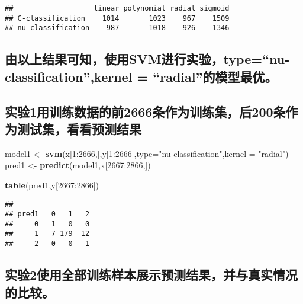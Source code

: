 \documentclass[]{article}
\newenvironment{Shaded}{\begin{snugshade}}{\end{snugshade}}
\newcommand{\KeywordTok}[1]{\textcolor[rgb]{0.13,0.29,0.53}{\textbf{{#1}}}}
\newcommand{\DataTypeTok}[1]{\textcolor[rgb]{0.13,0.29,0.53}{{#1}}}
\newcommand{\DecValTok}[1]{\textcolor[rgb]{0.00,0.00,0.81}{{#1}}}
\newcommand{\StringTok}[1]{\textcolor[rgb]{0.31,0.60,0.02}{{#1}}}
\newcommand{\NormalTok}[1]{{#1}}
\begin{document}
\begin{verbatim}
##                   linear polynomial radial sigmoid
## C-classification    1014       1023    967    1509
## nu-classification    987       1018    926    1346
\end{verbatim}

\subsection{\texorpdfstring{由以上结果可知，使用SVM进行实验，type=``nu-classification'',kernel
=
``radial''的模型最优。}{由以上结果可知，使用SVM进行实验，type=nu-classification,kernel = radial的模型最优。}}\label{svmtypenu-classificationkernel-radial}

\subsection{实验1用训练数据的前2666条作为训练集，后200条作为测试集，看看预测结果}\label{12666200}

\begin{Shaded}
\begin{Highlighting}[]
\NormalTok{model1 <-}\StringTok{ }\KeywordTok{svm}\NormalTok{(x[}\DecValTok{1}\NormalTok{:}\DecValTok{2666}\NormalTok{,],y[}\DecValTok{1}\NormalTok{:}\DecValTok{2666}\NormalTok{],}\DataTypeTok{type=}\StringTok{"nu-classification"}\NormalTok{,}\DataTypeTok{kernel =} \StringTok{"radial"}\NormalTok{)}
\NormalTok{pred1 <-}\StringTok{ }\KeywordTok{predict}\NormalTok{(model1,x[}\DecValTok{2667}\NormalTok{:}\DecValTok{2866}\NormalTok{,])}
\end{Highlighting}
\end{Shaded}

\begin{Shaded}
\begin{Highlighting}[]
\KeywordTok{table}\NormalTok{(pred1,y[}\DecValTok{2667}\NormalTok{:}\DecValTok{2866}\NormalTok{])}
\end{Highlighting}
\end{Shaded}

\begin{verbatim}
##      
## pred1   0   1   2
##     0   1   0   0
##     1   7 179  12
##     2   0   0   1
\end{verbatim}

\subsection{实验2使用全部训练样本展示预测结果，并与真实情况的比较。}\label{2}
\end{document}
